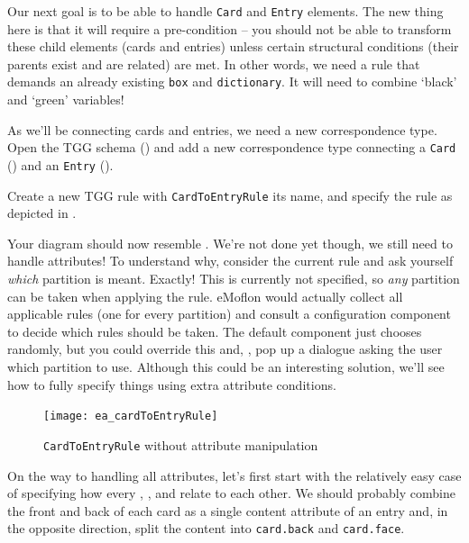 Our next goal is to be able to handle \texttt{Card} and \texttt{Entry} elements. 
The new thing here is that it will require a pre-condition -- you should not be able to transform these child elements (cards and entries) unless certain structural conditions (their parents exist and are related) are met. 
In other words, we need a rule that demands an already existing \texttt{box} and \texttt{dictionary}. 
It will need to combine `black' and `green' variables! 

\begin{stepbystep}

\item As we'll be connecting cards and entries, we need a new correspondence type.
Open the TGG schema () and add a new correspondence type  connecting a \texttt{Card} () and an \texttt{Entry} ().

\item Create a new TGG rule with \texttt{CardToEntryRule} its name, and specify the rule as depicted in .
\end{stepbystep}

Your diagram should now resemble . 
We're not done yet though, we still need to handle attributes!
To understand why, consider the current rule and ask yourself  \emph{which} partition is meant.
Exactly!  This is currently not specified, so \emph{any} partition can be taken when applying the rule.
eMoflon would actually collect all applicable rules (one for every partition) and consult a configuration component to decide which rules should be taken.
The default component just chooses randomly, but you could override this and, \eg, pop up a dialogue asking the user which partition to use.
Although this could be an interesting solution, we'll see how to fully specify things using extra attribute conditions.

\begin{figure}[htbp]
  \begin{center}
    \texttt{[image: ea\_cardToEntryRule]}
    \caption{\texttt{CardToEntryRule} without attribute manipulation}
    \label{ea:cardtoentry_1}
  \end{center}
\end{figure}

On the way to handling all attributes, let's first start with the relatively easy case of specifying how every , , and  relate to each other.
We should probably combine the front and back of each card as a single content attribute of an entry and, in the opposite direction, split the content into \texttt{card.back} and \texttt{card.face}.

